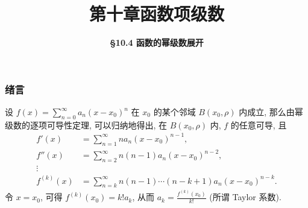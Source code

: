 \everymath{\displaystyle}



\title[第十章\\
函数项级数]{\texorpdfstring{\LARGE \bfseries 第十章\quad 函数项级数}{第十章 函数项级数}} %
\author[\smaller \S 10.4\\
幂级数展开] %
{\Large \bfseries \S 10.4 函数的幂级数展开}
\date{}





\begin{frame}

\titlepage %

\end{frame}



\begin{frame}
\frametitle{绪言}

设 $f(x) = \sum_{n=0}^\infty a_n (x - x_0)^n$ 在 $x_0$ 的某个邻域 $B(x_0, \rho)$ 内成立, 那么由幂级数的逐项可导性定理, 可以归纳地得出, 在 $B(x_0, \rho)$ 内, $f$ 的任意可导, 且
\begin{align*}
f'(x) & = \sum_{n=1}^\infty n a_n (x - x_0)^{n-1}, \\
f''(x) & = \sum_{n=2}^\infty n (n-1) a_n (x - x_0)^{n-2}, \\
\vdots \\
f^{(k)}(x) & = \sum_{n=k}^\infty n (n-1) \cdots (n-k+1) a_n (x - x_0)^{n-k}.
\end{align*}
令 $x = x_0$, 可得 $f^{(k)}(x_0) = k! a_k$, 从而 $a_k = \frac{f^{(k)}(x_0)}{k!}$ (所谓 Taylor 系数).

\end{frame}

